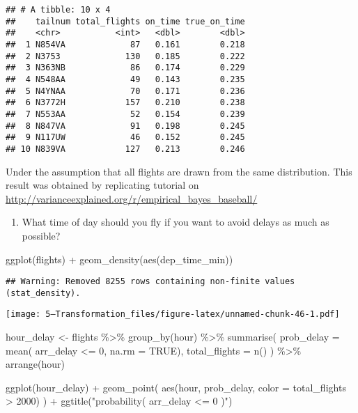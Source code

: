 \documentclass[
]{article}
\newenvironment{Shaded}{\begin{snugshade}}{\end{snugshade}}
\newcommand{\AttributeTok}[1]{\textcolor[rgb]{0.77,0.63,0.00}{#1}}
\newcommand{\ConstantTok}[1]{\textcolor[rgb]{0.00,0.00,0.00}{#1}}
\newcommand{\DecValTok}[1]{\textcolor[rgb]{0.00,0.00,0.81}{#1}}
\newcommand{\FunctionTok}[1]{\textcolor[rgb]{0.00,0.00,0.00}{#1}}
\newcommand{\NormalTok}[1]{#1}
\newcommand{\OtherTok}[1]{\textcolor[rgb]{0.56,0.35,0.01}{#1}}
\newcommand{\SpecialCharTok}[1]{\textcolor[rgb]{0.00,0.00,0.00}{#1}}
\newcommand{\StringTok}[1]{\textcolor[rgb]{0.31,0.60,0.02}{#1}}
\providecommand{\tightlist}{%
  \setlength{\itemsep}{0pt}\setlength{\parskip}{0pt}}
\begin{document}
\begin{verbatim}
## # A tibble: 10 x 4
##    tailnum total_flights on_time true_on_time
##    <chr>           <int>   <dbl>        <dbl>
##  1 N854VA             87   0.161        0.218
##  2 N3753             130   0.185        0.222
##  3 N363NB             86   0.174        0.229
##  4 N548AA             49   0.143        0.235
##  5 N4YNAA             70   0.171        0.236
##  6 N3772H            157   0.210        0.238
##  7 N553AA             52   0.154        0.239
##  8 N847VA             91   0.198        0.245
##  9 N117UW             46   0.152        0.245
## 10 N839VA            127   0.213        0.246
\end{verbatim}

Under the assumption that all flights are drawn from the same
distribution. This result was obtained by replicating tutorial on
\url{http://varianceexplained.org/r/empirical_bayes_baseball/}

\begin{enumerate}
\def\labelenumi{\arabic{enumi}.}
\tightlist
\item
  What time of day should you fly if you want to avoid delays as much as
  possible?
\end{enumerate}

\begin{Shaded}
\begin{Highlighting}[]
\FunctionTok{ggplot}\NormalTok{(flights) }\SpecialCharTok{+}
  \FunctionTok{geom\_density}\NormalTok{(}\FunctionTok{aes}\NormalTok{(dep\_time\_min))}
\end{Highlighting}
\end{Shaded}

\begin{verbatim}
## Warning: Removed 8255 rows containing non-finite values (stat_density).
\end{verbatim}

\texttt{[image: 5---Transformation\_files/figure-latex/unnamed-chunk-46-1.pdf]}

\begin{Shaded}
\begin{Highlighting}[]
\NormalTok{hour\_delay }\OtherTok{\textless{}{-}}\NormalTok{ flights }\SpecialCharTok{\%\textgreater{}\%} 
    \FunctionTok{group\_by}\NormalTok{(hour) }\SpecialCharTok{\%\textgreater{}\%} 
    \FunctionTok{summarise}\NormalTok{( }\AttributeTok{prob\_delay =} \FunctionTok{mean}\NormalTok{( arr\_delay }\SpecialCharTok{\textless{}=} \DecValTok{0}\NormalTok{, }\AttributeTok{na.rm =} \ConstantTok{TRUE}\NormalTok{),}
               \AttributeTok{total\_flights =} \FunctionTok{n}\NormalTok{() ) }\SpecialCharTok{\%\textgreater{}\%} 
    \FunctionTok{arrange}\NormalTok{(hour)}

\FunctionTok{ggplot}\NormalTok{(hour\_delay) }\SpecialCharTok{+}
  \FunctionTok{geom\_point}\NormalTok{( }\FunctionTok{aes}\NormalTok{(hour, prob\_delay, }\AttributeTok{color =}\NormalTok{ total\_flights }\SpecialCharTok{\textgreater{}} \DecValTok{2000}\NormalTok{) ) }\SpecialCharTok{+}
  \FunctionTok{ggtitle}\NormalTok{(}\StringTok{"probability( arr\_delay \textless{}= 0 )"}\NormalTok{)}
\end{Highlighting}
\end{Shaded}
\end{document}

